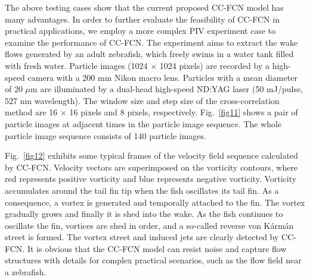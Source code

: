 \documentclass[%
 aip,
 amsmath,amssymb,
 reprint,%
]{revtex4-1}
\begin{document}

The above testing cases show that the current proposed CC-FCN model has many advantages.
In order to further evaluate the feasibility of CC-FCN in practical applications, we employ a more complex PIV experiment case to examine the performance of CC-FCN.
The experiment aims to extract the wake flows generated by an adult zebrafish, which freely swims in a water tank filled with fresh water. 
Particle images (1024 $\times$ 1024 pixels) are recorded by a high-speed camera with a 200 mm Nikon macro lens. Particles with a mean diameter of 20 $\mu$m are illuminated by a dual-head high-speed ND:YAG laser (50 mJ/pulse, 527 nm wavelength).
The window size and step size of the cross-correlation method are 16 $\times$ 16 pixels and 8 pixels, respectively. 
Fig.~\ref{fig11} shows a pair of particle images at adjacent times in the particle image sequence. 
The whole particle image sequence consists of 140 particle images.

Fig.~\ref{fig12} exhibits some typical frames of the velocity field sequence calculated by CC-FCN. Velocity vectors are superimposed on the vorticity contours, where red represents positive vorticity and blue represents negative vorticity.
Vorticity accumulates around the tail fin tip when the fish oscillates its tail fin. As a consequence, a vortex is generated and temporally attached to the fin. The vortex gradually grows and finally it is shed into the wake.
As the fish continues to oscillate the fin, vortices are shed in order, and a so-called reverse von K\'{a}rm\'{a}n street \citep{Triantafyllou1993} is formed.
The vortex street and induced jets are clearly detected by CC-FCN.
It is obvious that the CC-FCN model can resist noise and capture flow structures with details for complex practical scenarios, such as the flow field near a zebrafish.
\end{document}
